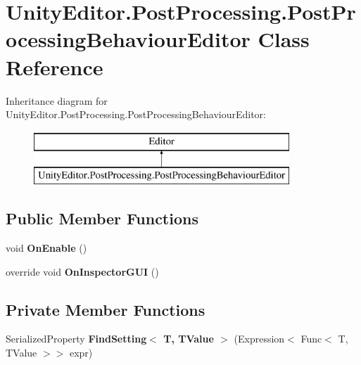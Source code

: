 \hypertarget{class_unity_editor_1_1_post_processing_1_1_post_processing_behaviour_editor}{}\section{Unity\+Editor.\+Post\+Processing.\+Post\+Processing\+Behaviour\+Editor Class Reference}
\label{class_unity_editor_1_1_post_processing_1_1_post_processing_behaviour_editor}
Inheritance diagram for Unity\+Editor.\+Post\+Processing.\+Post\+Processing\+Behaviour\+Editor\+:\begin{figure}[H]
\begin{center}
\leavevmode
\includegraphics[height=2.000000cm]{class_unity_editor_1_1_post_processing_1_1_post_processing_behaviour_editor}
\end{center}
\end{figure}
\subsection*{Public Member Functions}
\begin{DoxyCompactItemize}
\item 
\mbox{\label{class_unity_editor_1_1_post_processing_1_1_post_processing_behaviour_editor_a8934c4d3ca6fe5a4023285ac1a4f3358}} 
void {\bfseries On\+Enable} ()
\item 
\mbox{\label{class_unity_editor_1_1_post_processing_1_1_post_processing_behaviour_editor_a5a78f117e6e64b8abe14976c202ec7f4}} 
override void {\bfseries On\+Inspector\+G\+UI} ()
\end{DoxyCompactItemize}
\subsection*{Private Member Functions}
\begin{DoxyCompactItemize}
\item 
\mbox{\label{class_unity_editor_1_1_post_processing_1_1_post_processing_behaviour_editor_a8f6e0cd46a20d6572cd586fbb9725ed9}} 
Serialized\+Property {\bfseries Find\+Setting$<$ T, T\+Value $>$} (Expression$<$ Func$<$ T, T\+Value $>$$>$ expr)
\end{DoxyCompactItemize}
